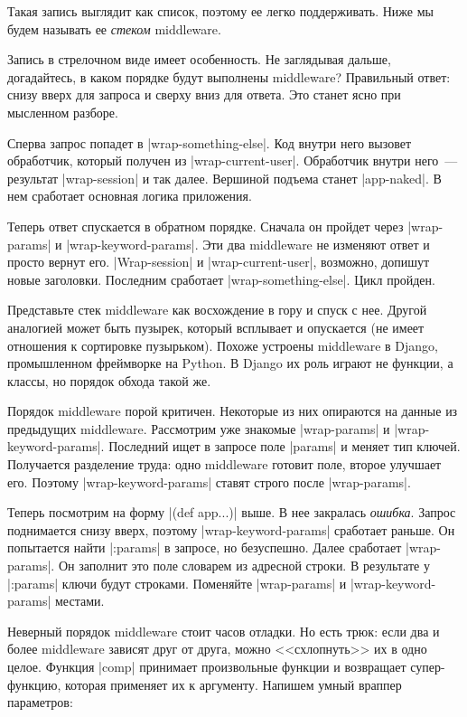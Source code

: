 Такая запись выглядит как список, поэтому ее легко поддерживать. Ниже мы будем
называть ее \emph{стеком} middleware.

Запись в стрелочном виде имеет особенность. Не заглядывая дальше, догадайтесь, в
каком порядке будут выполнены middleware? Правильный ответ: снизу вверх для
запроса и сверху вниз для ответа. Это станет ясно при мысленном разборе.

Сперва запрос попадет в \spverb|wrap-something-else|. Код внутри него вызовет
обработчик, который получен из \spverb|wrap-current-user|. Обработчик внутри
него~--- результат \spverb|wrap-session| и так далее. Вершиной подъема станет
\spverb|app-naked|. В нем сработает основная логика приложения.

Теперь ответ спускается в обратном порядке. Сначала он пройдет через
\spverb|wrap-params| и \spverb|wrap-keyword-params|. Эти два middleware не
изменяют ответ и просто вернут его. \spverb|Wrap-session| и
\spverb|wrap-current-user|, возможно, допишут новые заголовки. Последним
сработает \spverb|wrap-something-else|. Цикл пройден.

Представьте стек middleware как восхождение в гору и спуск с нее. Другой
аналогией может быть пузырек, который всплывает и опускается (не имеет отношения
к сортировке пузырьком). Похоже устроены middleware в Django, промышленном
фреймворке на Python. В Django их роль играют не функции, а классы, но порядок
обхода такой же.

Порядок middleware порой критичен. Некоторые из них опираются на данные из
предыдущих middleware. Рассмотрим уже знакомые \spverb|wrap-params| и
\spverb|wrap-keyword-params|. Последний ищет в запросе поле \spverb|params| и
меняет тип ключей. Получается разделение труда: одно middleware готовит поле,
второе улучшает его. Поэтому \spverb|wrap-keyword-params| ставят строго после
\spverb|wrap-params|.

Теперь посмотрим на форму \spverb|(def app...)| выше. В нее закралась
\emph{ошибка}. Запрос поднимается снизу вверх, поэтому
\spverb|wrap-keyword-params| сработает раньше. Он попытается найти
\spverb|:params| в запросе, но безуспешно. Далее сработает
\spverb|wrap-params|. Он заполнит это поле словарем из адресной строки. В
результате у \spverb|:params| ключи будут строками. Поменяйте
\spverb|wrap-params| и \spverb|wrap-keyword-params| местами.

Неверный порядок middleware стоит часов отладки. Но есть трюк: если два и более
middleware зависят друг от друга, можно <<схлопнуть>> их в одно целое. Функция
\spverb|comp| принимает произвольные функции и возвращает супер-функцию, которая
применяет их к аргументу. Напишем умный враппер параметров:

